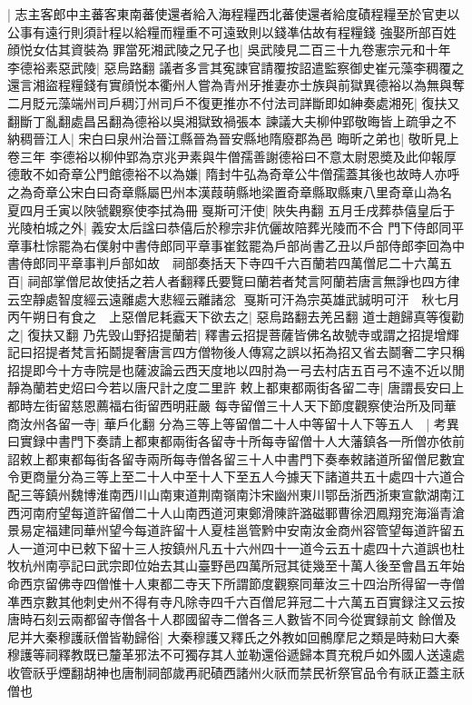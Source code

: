 |{
	志主客郎中主蕃客東南蕃使還者給入海程糧西北蕃使還者給度磧程糧至於官吏以公事有遠行則須計程以給糧而糧重不可遠致則以錢凖估故有程糧錢}
強娶所部百姓顔悦女估其資裝為罪當死湘武陵之兄子也|{
	吳武陵見二百三十九卷憲宗元和十年}
李德裕素惡武陵|{
	惡烏路翻}
議者多言其寃諫官請覆按詔遣監察御史崔元藻李稠覆之還言湘盜程糧錢有實顔悦本衢州人嘗為青州牙推妻亦士族與前獄異德裕以為無與奪二月貶元藻端州司戶稠汀州司戶不復更推亦不付法司詳斷即如紳奏處湘死|{
	復扶又翻斷丁亂翻處昌呂翻為德裕以吳湘獄致禍張本}
諫議大夫柳仲郢敬晦皆上疏爭之不納稠晉江人|{
	宋白曰泉州治晉江縣晉為晉安縣地隋廢郡為邑}
晦昕之弟也|{
	敬昕見上卷三年}
李德裕以柳仲郢為京兆尹素與牛僧孺善謝德裕曰不意太尉恩奬及此仰報厚德敢不如奇章公門館德裕不以為嫌|{
	隋封牛弘為奇章公牛僧孺蓋其後也故時人亦呼之為奇章公宋白曰奇章縣屬巴州本漢葭萌縣地梁置奇章縣取縣東八里奇章山為名}
夏四月壬寅以陜虢觀察使李拭為冊戛斯可汗使|{
	陜失冉翻}
五月壬戌葬恭僖皇后于光陵柏城之外|{
	義安太后諡曰恭僖后於穆宗非伉儷故陪葬光陵而不合}
門下侍郎同平章事杜悰罷為右僕射中書侍郎同平章事崔鉉罷為戶部尚書乙丑以戶部侍郎李回為中書侍郎同平章事判戶部如故　祠部奏括天下寺四千六百蘭若四萬僧尼二十六萬五百|{
	祠部掌僧尼故使括之若人者翻釋氏要覽曰蘭若者梵言阿蘭若唐言無諍也四方律云空靜處智度經云遠離處大悲經云離諸忿}
戛斯可汗為宗英雄武誠明可汗　秋七月丙午朔日有食之　上惡僧尼耗蠧天下欲去之|{
	惡烏路翻去羌呂翻}
道士趙歸真等復勸之|{
	復扶又翻}
乃先毁山野招提蘭若|{
	釋書云招提菩薩皆佛名故號寺或謂之招提增輝記曰招提者梵言拓鬬提奢唐言四方僧物後人傳寫之誤以拓為招又省去鬬奢二字只稱招提即今十方寺院是也薩波論云西天度地以四肘為一弓去村店五百弓不遠不近以閒靜為蘭若史炤曰今若以唐尺計之度二里許}
敕上都東都兩街各留二寺|{
	唐謂長安曰上都時左街留慈恩薦福右街留西明莊嚴}
每寺留僧三十人天下節度觀察使治所及同華商汝州各留一寺|{
	華戶化翻}
分為三等上等留僧二十人中等留十人下等五人　|{
	考異曰實録中書門下奏請上都東都兩街各留寺十所每寺留僧十人大藩鎮各一所僧亦依前詔敕上都東都每街各留寺兩所每寺僧各留三十人中書門下奏奉敕諸道所留僧尼數宜令更商量分為三等上至二十人中至十人下至五人今據天下諸道共五十處四十六道合配三等鎮州魏博淮南西川山南東道荆南嶺南汴宋幽州東川鄂岳浙西浙東宣歙湖南江西河南府望每道許留僧二十人山南西道河東鄭滑陳許潞磁鄆曹徐泗鳳翔兖海淄青滄景易定福建同華州望今每道許留十人夏桂邕管黔中安南汝金商州容管望每道許留五人一道河中已敕下留十三人按鎮州凡五十六州四十一道今云五十處四十六道誤也杜牧杭州南亭記曰武宗即位始去其山臺野邑四萬所冠其徒幾至十萬人後至會昌五年始命西京留佛寺四僧惟十人東都二寺天下所謂節度觀察同華汝三十四治所得留一寺僧凖西京數其他刺史州不得有寺凡除寺四千六百僧尼䈂冠二十六萬五百實録注又云按唐時石刻云兩都留寺僧各十人郡國留寺二僧各三人數皆不同今從實録前文}
餘僧及尼并大秦穆護祅僧皆勒歸俗|{
	大秦穆護又釋氏之外教如回鶻摩尼之類是時勑曰大秦穆護等祠釋教既已釐革邪法不可獨存其人並勒還俗遞歸本貫充稅戶如外國人送遠處收管祅乎煙翻胡神也唐制祠部歲再祀磧西諸州火祅而禁民祈祭官品令有祅正蓋主祅僧也}
